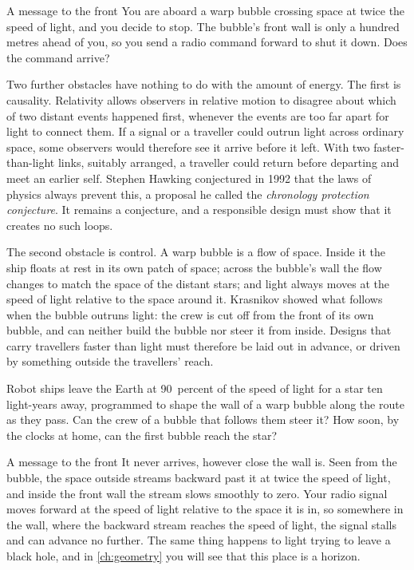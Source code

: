 \begin{thought}{A message to the front}
You are aboard a warp bubble crossing space at twice the speed of light, and
you decide to stop. The bubble's front wall is only a hundred metres ahead of
you, so you send a radio command forward to shut it down. Does the command
arrive?
\end{thought}

Two further obstacles have nothing to do with the amount of energy. The first
is causality. Relativity allows observers in relative motion to disagree about
which of two distant events happened first, whenever the events are too far
apart for light to connect them. If a signal or a traveller could outrun
light across ordinary space, some observers would therefore see it arrive
before it left. With two faster-than-light links, suitably arranged, a
traveller could return before departing and meet an earlier self. Stephen
Hawking conjectured in 1992 that the laws of physics always prevent this,
a proposal he called the \emph{chronology protection conjecture}. It remains
a conjecture, and a responsible design must show that it creates no such
loops.

The second obstacle is control. A warp bubble is a flow of space. Inside it
the ship floats at rest in its own patch of space; across the bubble's wall
the flow changes to match the space of the distant stars; and light always
moves at the speed of light relative to the space around it. Krasnikov showed
what follows when the bubble outruns light: the crew is cut off from the front
of its own bubble, and can neither build the bubble nor steer it from inside.
Designs that carry travellers faster than light must therefore be laid out in
advance, or driven by something outside the travellers' reach.

\begin{checkpoint}[label=chk:krasnikov-control]
Robot ships leave the Earth at 90~percent of the speed of light for a star ten
light-years away, programmed to shape the wall of a warp bubble along the route
as they pass. Can the crew of a bubble that follows them steer it? How soon,
by the clocks at home, can the first bubble reach the star?
\end{checkpoint}

\begin{revisited}{A message to the front}
It never arrives, however close the wall is. Seen from the bubble, the space outside streams backward
past it at twice the speed of light, and inside the front wall the stream
slows smoothly to zero. Your radio signal moves forward at the speed of light
relative to the space it is in, so somewhere in the wall, where the backward
stream reaches the speed of light, the signal stalls and can advance no
further. The same thing happens to light trying to leave a black hole, and in
\cref{ch:geometry} you will see that this place is a horizon.
\end{revisited}

